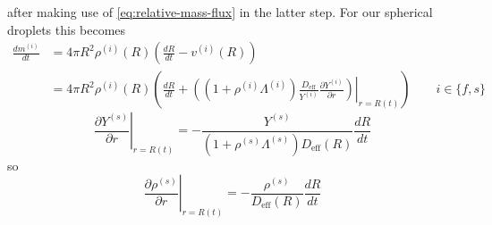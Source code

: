 \documentclass[12pt,twoside]{report}
\begin{document}
after making use of \eqref{eq:relative-mass-flux} in the latter step.
For our spherical droplets this becomes
\begin{equation}
  \begin{aligned}
    \frac{d m^{(i)}}{dt} &=
    4 \pi R^2
    \rho^{(i)}(R) \left( \frac{dR}{dt} - v^{(i)}(R) \right) \\
    &=
    4 \pi R^2
    \rho^{(i)}(R) \left(
    \frac{dR}{dt} +
    \left.\left(
    (1 + \rho^{(i)} \Lambda^{(i)})
    \frac{D_{\textrm{eff}}}{Y^{(i)}}
    \frac{\partial Y^{(i)}}{\partial r}
    \right)\right|_{r=R(t)}
    \right)
    \qquad i \in \{f,s\}
  \end{aligned}
\end{equation}
\begin{equation}
  \left. \frac{\partial Y^{(s)}}{\partial r} \right|_{r=R(t)} =
  -
  \frac{Y^{(s)}}{(1 + \rho^{(s)} \Lambda^{(s)}) D_{\textrm{eff}}(R)}
  \frac{dR}{dt}
\end{equation}
so
\begin{equation}
  \left. \frac{\partial \rho^{(s)}}{\partial r} \right|_{r=R(t)} =
  -
  \frac{\rho^{(s)}}{D_{\textrm{eff}}(R)}
  \frac{dR}{dt}
\end{equation}
\end{document}
